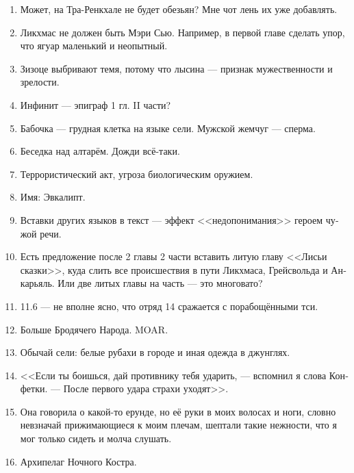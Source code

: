 \documentclass[a4paper,12pt,fleqn]{book}\usepackage{polyglossia}\setdefaultlanguage[babelshorthands=true]{russian}\setotherlanguage{english}\defaultfontfeatures{Ligatures=TeX,Mapping=tex-text}\usepackage{xcolor}\newcommand{\ml}[3]{#2}
\begin{document}
{\begin{enumerate}
\item Может, на Тра-Ренкхале не будет обезьян?
Мне чот лень их уже добавлять.

\item Ликхмас не должен быть Мэри Сью.
Например, в первой главе сделать упор, что ягуар маленький и неопытный.

\item Зизоце выбривают темя, потому что лысина --- признак мужественности и зрелости.

\item Инфинит --- эпиграф 1 гл. II части?

\item Бабочка --- грудная клетка на языке сели.
Мужской жемчуг --- сперма.

\item Беседка над алтарём.
Дожди всё-таки.

\item Террористический акт, угроза биологическим оружием.

\item Имя: Эвкалипт.

\item Вставки других языков в текст --- эффект <<недопонимания>> героем чужой речи.

\item Есть предложение после 2 главы 2 части вставить литую главу <<Лисьи сказки>>, куда слить все происшествия в пути Ликхмаса, Грейсвольда и Анкарьяль.
Или две литых главы на часть --- это многовато?

\item 11.6 --- не вполне ясно, что отряд 14 сражается с порабощёнными тси.

\item Больше Бродячего Народа.
MOAR.

\item Обычай сели: белые рубахи в городе и иная одежда в джунглях.

\item <<Если ты боишься, дай противнику тебя ударить, --- вспомнил я слова Конфетки.
--- После первого удара страхи уходят>>.

\item Она говорила о какой-то ерунде, но её руки в моих волосах и ноги, словно невзначай прижимающиеся к моим плечам, шептали такие нежности, что я мог только сидеть и молча слушать.

\item Архипелаг Ночного Костра.


\end{enumerate}}
\end{document}
